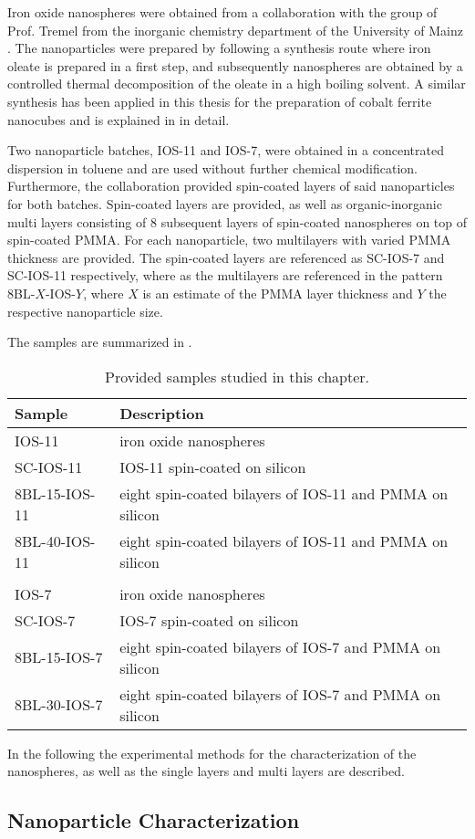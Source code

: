 \documentclass[\main/dresen_thesis.tex]{subfiles}
\renewcommand{\thisPath}{\main/chapters/looselyPackedNS/experimentalMethods/}
\begin{document}
  Iron oxide nanospheres were obtained from a collaboration with the group of Prof. Tremel from the inorganic chemistry department of the University of Mainz \cite{Wichmann_2016_Synth}.
  The nanoparticles were prepared by following a synthesis route where iron oleate is prepared in a first step, and subsequently nanospheres are obtained by a controlled thermal decomposition of the oleate in a high boiling solvent.
  A similar synthesis has been applied in this thesis for the preparation of cobalt ferrite nanocubes and is explained in  in detail.

  Two nanoparticle batches, IOS-11 and IOS-7, were obtained in a concentrated dispersion in toluene and are used without further chemical modification.
  Furthermore, the collaboration provided spin-coated layers of said nanoparticles for both batches.
  Spin-coated layers are provided, as well as organic-inorganic multi layers consisting of 8 subsequent layers of spin-coated nanospheres on top of spin-coated PMMA.
  For each nanoparticle, two multilayers with varied PMMA thickness are provided.
  The spin-coated layers are referenced as SC-IOS-7 and SC-IOS-11 respectively, where as the multilayers are referenced in the pattern 8BL-$X$-IOS-$Y$, where $X$ is an estimate of the PMMA layer thickness and $Y$ the respective nanoparticle size.

  The samples are summarized in .
  \begin{table}[!htbp]
    \centering
    \caption{\label{tab:looselyPackedNS:expMethods:samples}Provided samples studied in this chapter.}
    \begin{tabular}{ l | l }
      \textbf{Sample}  & Description \\
      \hline
      IOS-11        & iron oxide nanospheres\\
      SC-IOS-11     & IOS-11 spin-coated on silicon\\
      8BL-15-IOS-11 & eight spin-coated bilayers of IOS-11 and PMMA on silicon\\
      8BL-40-IOS-11 & eight spin-coated bilayers of IOS-11 and PMMA on silicon\\
      \\
      IOS-7         & iron oxide nanospheres\\
      SC-IOS-7      & IOS-7 spin-coated on silicon\\
      8BL-15-IOS-7  & eight spin-coated bilayers of IOS-7 and PMMA on silicon\\
      8BL-30-IOS-7  & eight spin-coated bilayers of IOS-7 and PMMA on silicon\\
      \hline
    \end{tabular}
  \end{table}

  In the following the experimental methods for the characterization of the nanospheres, as well as the single layers and multi layers are described.

  \subsection{Nanoparticle Characterization}
  
    \FloatBarrier
\end{document}
